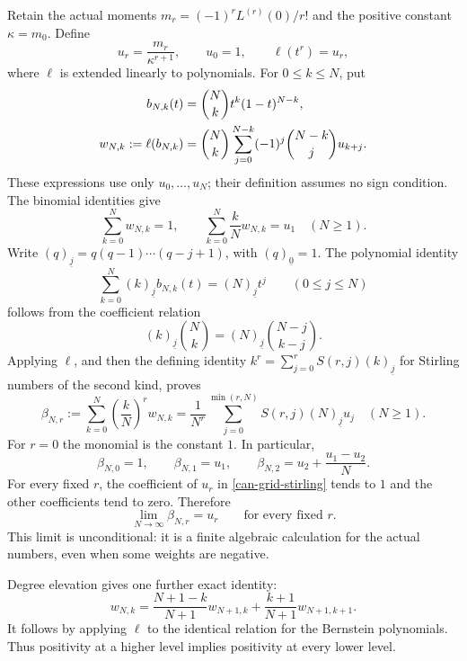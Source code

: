 \documentclass[11pt,a4paper]{article}
\numberwithin{equation}{section}
\theoremstyle{definition}
\theoremstyle{remark}
\begin{document}
Retain the actual moments $m_r=(-1)^rL^{(r)}(0)/r!$ and the positive
constant $\kappa=m_0$. Define
\begin{equation}\label{can-grid-normalization}
u_r=\frac{m_r}{\kappa^{r+1}},\qquad u_0=1,
\qquad \ell(t^r)=u_r,
\end{equation}
where $\ell$ is extended linearly to polynomials. For $0\leq k\leq N$,
put
\begin{align}
b_{N,k}(t)&=\binom Nk t^k(1-t)^{N-k},\notag\\
w_{N,k}:=\ell(b_{N,k})
&=\binom Nk\sum_{j=0}^{N-k}(-1)^j\binom{N-k}{j}u_{k+j}.
\label{can-grid-weights}
\end{align}
These expressions use only $u_0,\ldots,u_N$; their definition assumes
no sign condition. The binomial identities give
\begin{equation}\label{can-grid-mass-mean}
\sum_{k=0}^Nw_{N,k}=1,\qquad
\sum_{k=0}^N\frac{k}{N}w_{N,k}=u_1\quad(N\geq1).
\end{equation}
Write $(q)_{\underline j}=q(q-1)\cdots(q-j+1)$, with
$(q)_{\underline0}=1$. The polynomial identity
\[
\sum_{k=0}^N(k)_{\underline j}b_{N,k}(t)
=(N)_{\underline j}t^j\qquad(0\leq j\leq N)
\]
follows from the coefficient relation
\[
(k)_{\underline j}\binom Nk
=(N)_{\underline j}\binom{N-j}{k-j}.
\]
Applying $\ell$, and then the defining identity
$k^r=\sum_{j=0}^r S(r,j)(k)_{\underline j}$ for Stirling numbers of
the second kind, proves
\begin{equation}\label{can-grid-stirling}
\beta_{N,r}:=\sum_{k=0}^N\left(\frac{k}{N}\right)^rw_{N,k}
=\frac1{N^r}\sum_{j=0}^{\min(r,N)}
 S(r,j)(N)_{\underline j}u_j\quad(N\geq1).
\end{equation}
For $r=0$ the monomial is the constant $1$. In particular,
\begin{equation}\label{can-grid-low-moments}
\beta_{N,0}=1,\qquad \beta_{N,1}=u_1,\qquad
\beta_{N,2}=u_2+\frac{u_1-u_2}{N}.
\end{equation}
For every fixed $r$, the coefficient of $u_r$ in
\eqref{can-grid-stirling} tends to $1$ and the other coefficients
tend to zero. Therefore
\begin{equation}\label{can-grid-moment-limit}
\lim_{N\to\infty}\beta_{N,r}=u_r\qquad\text{for every fixed }r.
\end{equation}
This limit is unconditional: it is a finite algebraic calculation
for the actual numbers, even when some weights are negative.

Degree elevation gives one further exact identity:
\begin{equation}\label{can-grid-elevation}
w_{N,k}=\frac{N+1-k}{N+1}w_{N+1,k}
       +\frac{k+1}{N+1}w_{N+1,k+1}.
\end{equation}
It follows by applying $\ell$ to the identical relation for the
Bernstein polynomials. Thus positivity at a higher level implies
positivity at every lower level.
\end{document}
